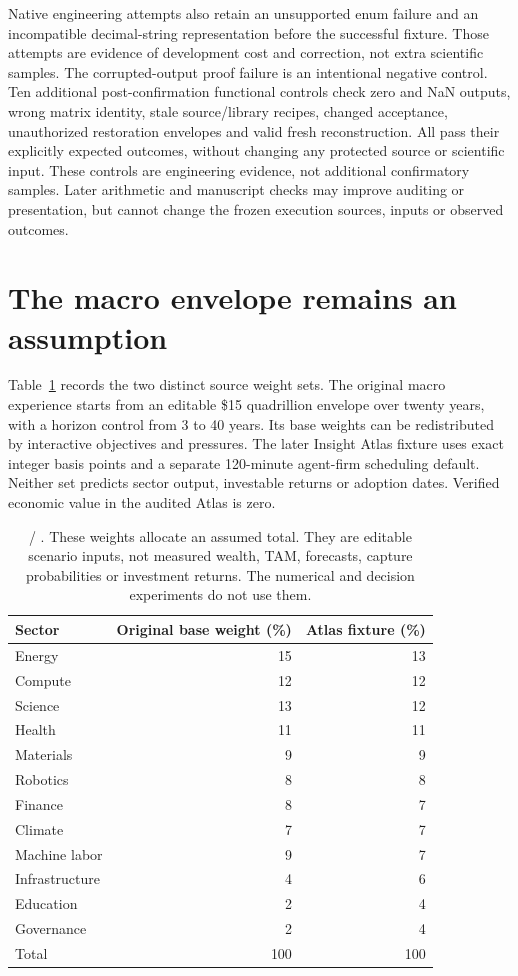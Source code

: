 Native engineering attempts also retain an unsupported enum failure and an incompatible decimal-string representation before the successful fixture. Those attempts are evidence of development cost and correction, not extra scientific samples. The corrupted-output proof failure is an intentional negative control. Ten additional post-confirmation functional controls check zero and NaN outputs, wrong matrix identity, stale source/library recipes, changed acceptance, unauthorized restoration envelopes and valid fresh reconstruction. All pass their explicitly expected outcomes, without changing any protected source or scientific input. These controls are engineering evidence, not additional confirmatory samples. Later arithmetic and manuscript checks may improve auditing or presentation, but cannot change the frozen execution sources, inputs or observed outcomes.

\section{The macro envelope remains an assumption}\label{app:macro}
Table~\ref{tab:macro} records the two distinct source weight sets. The original macro experience starts from an editable \$15 quadrillion envelope over twenty years, with a horizon control from 3 to 40 years. Its base weights can be redistributed by interactive objectives and pressures. The later Insight Atlas fixture uses exact integer basis points and a separate 120-minute agent-firm scheduling default. Neither set predicts sector output, investable returns or adoption dates. Verified economic value in the audited Atlas is zero. \citep{atlas2026,treasure2026}

\begin{table}[ht]\centering\small
\begin{tabular}{@{}lrr@{}}\toprule
Sector & Original base weight (\%) & Atlas fixture (\%)\\\midrule
Energy &15&13\\
Compute &12&12\\
Science &13&12\\
Health &11&11\\
Materials &9&9\\
Robotics &8&8\\
Finance &8&7\\
Climate &7&7\\
Machine labor &9&7\\
Infrastructure &4&6\\
Education &2&4\\
Governance &2&4\\\midrule
Total &100&100\\\bottomrule
\end{tabular}
\caption{\assum{} / \source{}. These weights allocate an assumed total. They are editable scenario inputs, not measured wealth, TAM, forecasts, capture probabilities or investment returns. The numerical and decision experiments do not use them.}
\label{tab:macro}\end{table}

